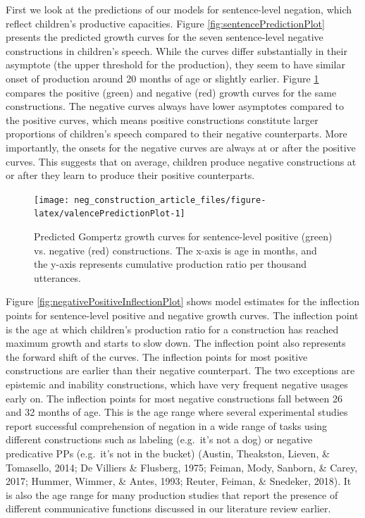 \documentclass[
  man,floatsintext]{apa6}
\begin{document}
First we look at the predictions of our models for sentence-level negation, which reflect children's productive capacities. Figure \ref{fig:sentencePredictionPlot} presents the predicted growth curves for the seven sentence-level negative constructions in children's speech. While the curves differ substantially in their asymptote (the upper threshold for the production), they seem to have similar onset of production around 20 months of age or slightly earlier. Figure \ref{fig:valencePredictionPlot} compares the positive (green) and negative (red) growth curves for the same constructions. The negative curves always have lower asymptotes compared to the positive curves, which means positive constructions constitute larger proportions of children's speech compared to their negative counterparts. More importantly, the onsets for the negative curves are always at or after the positive curves. This suggests that on average, children produce negative constructions at or after they learn to produce their positive counterparts.

\begin{figure}[H]

{\centering \texttt{[image: neg\_construction\_article\_files/figure-latex/valencePredictionPlot-1]} 

}

\caption{Predicted Gompertz growth curves for sentence-level positive (green) vs. negative (red) constructions. The x-axis is age in months, and the y-axis represents cumulative production ratio per thousand utterances.}\label{fig:valencePredictionPlot}
\end{figure}

Figure \ref{fig:negativePositiveInflectionPlot} shows model estimates for the inflection points for sentence-level positive and negative growth curves. The inflection point is the age at which children's production ratio for a construction has reached maximum growth and starts to slow down. The inflection point also represents the forward shift of the curves. The inflection points for most positive constructions are earlier than their negative counterpart. The two exceptions are epistemic and inability constructions, which have very frequent negative usages early on. The inflection points for most negative constructions fall between 26 and 32 months of age. This is the age range where several experimental studies report successful comprehension of negation in a wide range of tasks using different constructions such as labeling (e.g.~it's not a dog) or negative predicative PPs (e.g.~it's not in the bucket) (Austin, Theakston, Lieven, \& Tomasello, 2014; De Villiers \& Flusberg, 1975; Feiman, Mody, Sanborn, \& Carey, 2017; Hummer, Wimmer, \& Antes, 1993; Reuter, Feiman, \& Snedeker, 2018). It is also the age range for many production studies that report the presence of different communicative functions discussed in our literature review earlier.
\end{document}

